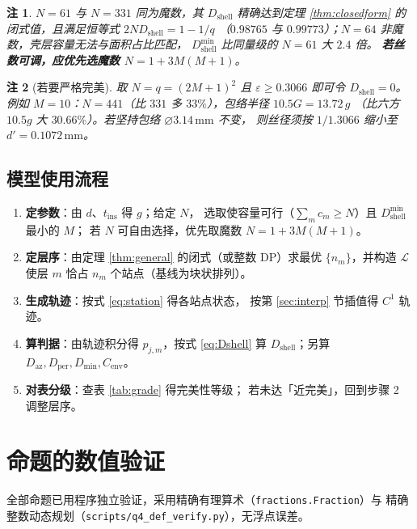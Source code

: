 \documentclass[12pt, a4paper]{ctexart}
\newtheorem{remark}{注}[section]
\newcommand{\Umm}{\ensuremath{\,\mathrm{mm}}}
\begin{document}
\begin{remark}
$N=61$ 与 $N=331$ 同为魔数，其 $D_{\mathrm{shell}}$ 精确达到定理
\ref{thm:closedform} 的闭式值，且满足恒等式 $2ND_{\mathrm{shell}}=1-1/q$
（$0.98765$ 与 $0.99773$）；$N=64$ 非魔数，壳层容量无法与面积占比匹配，
$D_{\mathrm{shell}}^{\min}$ 比同量级的 $N=61$ 大 $2.4$ 倍。
\textbf{若丝数可调，应优先选魔数 $N=1+3M(M+1)$}。
\end{remark}

\begin{remark}[若要严格完美]
取 $N=q=(2M+1)^2$ 且 $\varepsilon\ge0.3066$ 即可令 $D_{\mathrm{shell}}=0$。
例如 $M=10$：$N=441$（比 $331$ 多 $33\%$），包络半径 $10.5G = 13.72\,g$
（比六方 $10.5g$ 大 $30.66\%$）。若坚持包络 $\varnothing3.14\Umm$ 不变，
则丝径须按 $1/1.3066$ 缩小至 $d' = 0.1072\Umm$。
\end{remark}

\subsection{模型使用流程}

\begin{enumerate}[label=\textbf{步骤 \arabic*.}, leftmargin=3.6em, itemsep=3pt]
\item \textbf{定参数}：由 $d$、$t_{\mathrm{ins}}$ 得 $g$；给定 $N$，
选取使容量可行（$\sum_m c_m\ge N$）且 $D_{\mathrm{shell}}^{\min}$ 最小的 $M$；
若 $N$ 可自由选择，优先取魔数 $N=1+3M(M+1)$。
\item \textbf{定层序}：由定理 \ref{thm:general} 的闭式（或整数 DP）求最优
$\{n_m\}$，并构造 $\mathcal{L}$ 使层 $m$ 恰占 $n_m$ 个站点（基线为块状排列）。
\item \textbf{生成轨迹}：按式 \eqref{eq:station} 得各站点状态，
按第 \ref{sec:interp} 节插值得 $C^1$ 轨迹。
\item \textbf{算判据}：由轨迹积分得 $p_{j,m}$，按式 \eqref{eq:Dshell} 算
$D_{\mathrm{shell}}$；另算 $D_{\mathrm{az}},D_{\mathrm{per}},D_{\min},C_{\mathrm{env}}$。
\item \textbf{对表分级}：查表 \ref{tab:grade} 得完美性等级；
若未达「近完美」，回到步骤 2 调整层序。
\end{enumerate}

\section{命题的数值验证}
\label{sec:verify}

全部命题已用程序独立验证，采用精确有理算术（\texttt{fractions.Fraction}）与
精确整数动态规划（\texttt{scripts/q4\_def\_verify.py}），无浮点误差。
\end{document}
